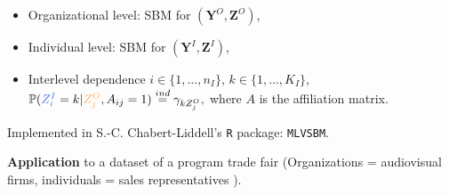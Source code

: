 \documentclass[nopagenumber,9pt]{beamer}
\newcommand{\ZR}[1]{Z^{I}_{#1}}
\newcommand{\ZL}[1]{Z^{O}_{#1}}
\newcommand{\bZR}{\mathbf{Z}^{I}}
\newcommand{\bZL}{\mathbf{Z}^{O}}
\newcommand{\bXR}{\bY^{I}}
\newcommand{\bXL}{\bY^{O}}
\newcommand{\nbr}{n_I}
\newcommand{\aff}{A}
\newcommand{\QR}{K_I}
\renewcommand{\P}{\mathbb{P}}
\newcommand{\bY}{\mathbf{Y}}
\begin{document}
\begin{frame}
\begin{figure}

    \label{fig:vuenetwork}
\end{figure}


\begin{itemize}
 \item \color{orangeorg}Organizational level: \color{black} SBM for $(\bXL,\bZL)$,
 \item \color{blueind}Individual level: \color{black} SBM for $(\bXR,\bZR)$,
 \item Interlevel dependence $i\in\{1,\ldots,\nbr\}$,
$k\in\{1,\ldots,\QR\}$,
$
       \P (\color{blueind}\ZR{i}\color{black}=k| \color{orangeorg} \ZL{j}\color{black}, \aff_{ij}=1)\overset{ind}{=} \gamma_{k\ZL{j}},
$ where $A$ is the affiliation matrix.
  \end{itemize}


  \smallskip
Implemented in S.-C. Chabert-Liddell's \texttt{R} package: \texttt{MLVSBM}.

 \smallskip
\textbf{Application} to a dataset of a program trade fair (Organizations = audiovisual firms, individuals = sales representatives ).

\end{frame}
\end{document}
